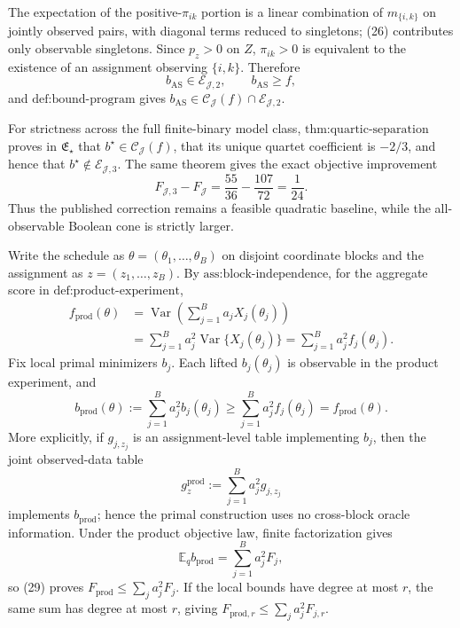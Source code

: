 The expectation of the positive-\(\pi_{ik}\) portion is a linear combination of \(m_{\{i,k\}}\) on jointly observed pairs, with diagonal terms reduced to singletons; (26) contributes only observable singletons.  Since \(p_z>0\) on \(Z\), \(\pi_{ik}>0\) is equivalent to the existence of an assignment observing \(\{i,k\}\).  Therefore
\[
 b_{\mathrm{AS}}\in\mathcal E_{\mathcal J,2},
 \quad\quad b_{\mathrm{AS}}\ge f,
\]
and \(\text{def:bound-program}\) gives
\(b_{\mathrm{AS}}\in\mathcal C_{\mathcal J}(f)\cap\mathcal E_{\mathcal J,2}\).

For strictness across the full finite-binary model class, \(\text{thm:quartic-separation}\) proves in \(\mathfrak E_\star\) that \(b^\star\in\mathcal C_{\mathcal J}(f)\), that its unique quartet coefficient is \(-2/3\), and hence that \(b^\star\notin\mathcal E_{\mathcal J,3}\).  The same theorem gives the exact objective improvement
\[
 F_{\mathcal J,3}-F_{\mathcal J}=\frac{55}{36}-\frac{107}{72}=\frac1{24}.
\]
Thus the published correction remains a feasible quadratic baseline, while the all-observable Boolean cone is strictly larger.

Write the schedule as \(\theta=(\theta_1,\ldots,\theta_B)\) on disjoint coordinate blocks and the assignment as \(z=(z_1,\ldots,z_B)\).  By \(\text{ass:block-independence}\), for the aggregate score in \(\text{def:product-experiment}\),
\[
 \begin{aligned}
 f_{\mathrm{prod}}(\theta)
 &=\operatorname{Var}\!\left(\sum_{j=1}^Ba_jX_j(\theta_j)\right)\\
 &=\sum_{j=1}^Ba_j^2\operatorname{Var}\{X_j(\theta_j)\}
 =\sum_{j=1}^Ba_j^2f_j(\theta_j).
 \end{aligned}\tag{28}
\]
Fix local primal minimizers \(b_j\).  Each lifted \(b_j(\theta_j)\) is observable in the product experiment, and
\[
 b_{\mathrm{prod}}(\theta):=\sum_{j=1}^Ba_j^2b_j(\theta_j)
 \ge\sum_{j=1}^Ba_j^2f_j(\theta_j)=f_{\mathrm{prod}}(\theta). \tag{29}
\]
More explicitly, if \(g_{j,z_j}\) is an assignment-level table implementing \(b_j\), then the joint observed-data table
\[
 g_z^{\mathrm{prod}}:=\sum_{j=1}^Ba_j^2g_{j,z_j}
\]
implements \(b_{\mathrm{prod}}\); hence the primal construction uses no cross-block oracle information.
Under the product objective law, finite factorization gives
\[
 \mathbb E_qb_{\mathrm{prod}}=
 \sum_{j=1}^Ba_j^2F_j,
\]
so (29) proves \(F_{\mathrm{prod}}\le\sum_ja_j^2F_j\).  If the local bounds have degree at most \(r\), the same sum has degree at most \(r\), giving
\(F_{\mathrm{prod},r}\le\sum_ja_j^2F_{j,r}\).


